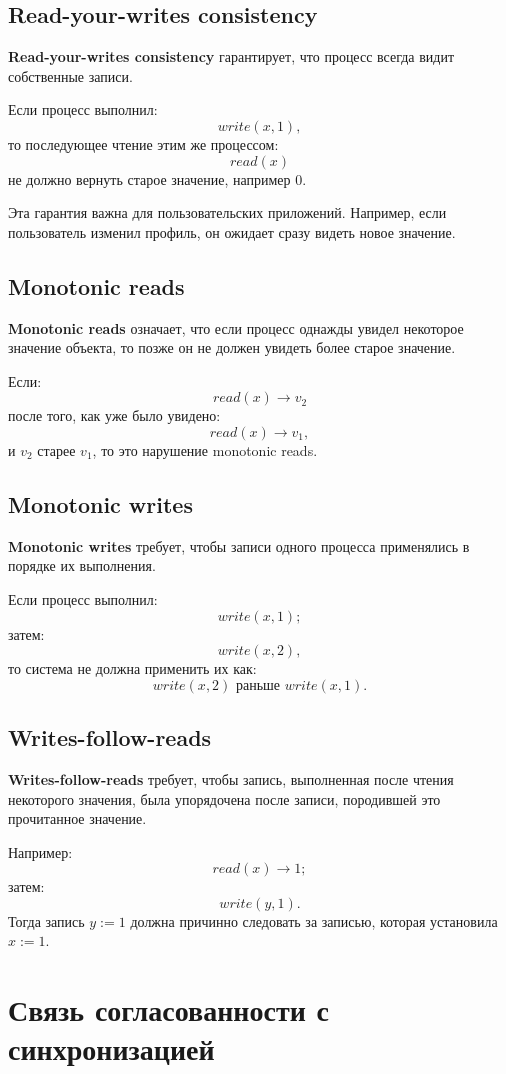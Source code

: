 \documentclass[12pt,a4paper]{article}
\begin{document}
\subsection{Read-your-writes consistency}

\textbf{Read-your-writes consistency} гарантирует, что процесс всегда видит собственные записи.

Если процесс выполнил:
\[
write(x,1),
\]
то последующее чтение этим же процессом:
\[
read(x)
\]
не должно вернуть старое значение, например $0$.

Эта гарантия важна для пользовательских приложений. Например, если пользователь изменил профиль, он ожидает сразу видеть новое значение.

\subsection{Monotonic reads}

\textbf{Monotonic reads} означает, что если процесс однажды увидел некоторое значение объекта, то позже он не должен увидеть более старое значение.

Если:
\[
read(x) \rightarrow v_2
\]
после того, как уже было увидено:
\[
read(x) \rightarrow v_1,
\]
и $v_2$ старее $v_1$, то это нарушение monotonic reads.

\subsection{Monotonic writes}

\textbf{Monotonic writes} требует, чтобы записи одного процесса применялись в порядке их выполнения.

Если процесс выполнил:
\[
write(x,1);
\]
затем:
\[
write(x,2),
\]
то система не должна применить их как:
\[
write(x,2) \text{ раньше } write(x,1).
\]

\subsection{Writes-follow-reads}

\textbf{Writes-follow-reads} требует, чтобы запись, выполненная после чтения некоторого значения, была упорядочена после записи, породившей это прочитанное значение.

Например:
\[
read(x) \rightarrow 1;
\]
затем:
\[
write(y,1).
\]
Тогда запись $y:=1$ должна причинно следовать за записью, которая установила $x:=1$.

\section{Связь согласованности с синхронизацией}
\end{document}
